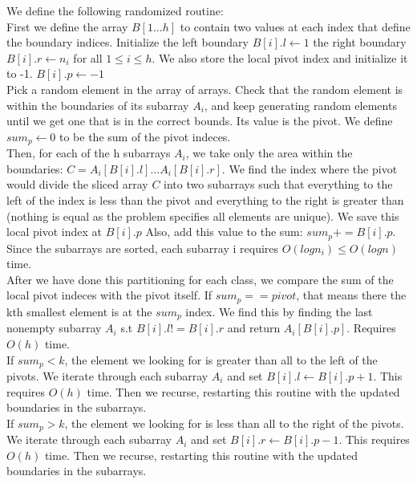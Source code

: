 \documentclass[11pt]{article}
\begin{document}
\begin{solution} 
We define the following randomized routine: \\


First we define the array $B[1...h]$ to contain two values at each index that define the boundary indices. Initialize the left boundary $B[i].l \gets 1$ the right boundary $B[i].r \gets n_i$ for all $1 \leq i \leq h$. We also store the local pivot index and initialize it to -1. $B[i].p \gets -1$ \\

Pick a random element in the array of arrays. Check that the random element is within the boundaries of its subarray $A_i$, and keep generating random elements until we get one that is in the correct bounds. Its value is the pivot. We define $sum_p \gets 0$ to be the sum of the pivot indeces. \\

Then, for each of the h subarrays $A_i$, we take only the area within the boundaries: $C= A_i[B[i].l]...A_i[B[i].r]$. We find the index where the pivot would divide the sliced array $C$ into two subarrays such that everything to the left of the index is less than the pivot and everything to the right is greater than (nothing is equal as the problem specifies all elements are unique). We save this local pivot index at $B[i].p$ Also, add this value to the sum: $sum_p += B[i].p$. Since the subarrays are sorted, each subarray i requires $O(log n_i) \leq O(logn)$ time. \\

After we have done this partitioning for each class, we compare the sum of the local pivot indeces with the pivot itself. If $sum_p == pivot$, that means there the kth smallest element is at the $sum_p$ index. We find this by finding the last nonempty subarray $A_i$ s.t $B[i].l != B[i].r$ and return $A_i[B[i].p]$. Requires $O(h)$ time. \\

If $sum_p < k$, the element we looking for is greater than all to the left of the pivots. We iterate through each subarray $A_i$ and set $B[i].l \gets B[i].p + 1$. This requires $O(h)$ time. Then we recurse, restarting this routine with the updated boundaries in the subarrays. \\

If $sum_p > k$, the element we looking for is less than all to the right of the pivots. We iterate through each subarray $A_i$ and set $B[i].r \gets B[i].p - 1$. This requires $O(h)$ time. Then we recurse, restarting this routine with the updated boundaries in the subarrays. \\


\end{solution}
\end{document}
